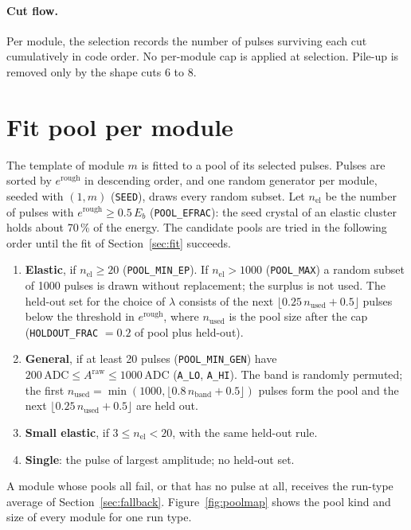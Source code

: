 \documentclass[11pt]{article}
\newcommand{\adc}{\,\mathrm{ADC}}
\newcommand{\code}[1]{\texttt{#1}}
\begin{document}
\paragraph{Cut flow.} Per module, the selection records the number of pulses surviving each cut cumulatively in code order. No per-module cap is applied at selection. Pile-up is removed only by the shape cuts 6 to 8.

\section{Fit pool per module}
\label{sec:pools}

The template of module $m$ is fitted to a pool of its selected pulses. Pulses are sorted by $e^{\mathrm{rough}}$ in descending order, and one random generator per module, seeded with $(1, m)$ (\code{SEED}), draws every random subset. Let $n_{\mathrm{el}}$ be the number of pulses with $e^{\mathrm{rough}} \ge 0.5\,E_b$ (\code{POOL\_EFRAC}): the seed crystal of an elastic cluster holds about 70\,\% of the energy. The candidate pools are tried in the following order until the fit of Section~\ref{sec:fit} succeeds.

\begin{enumerate}
\item \textbf{Elastic}, if $n_{\mathrm{el}} \ge 20$ (\code{POOL\_MIN\_EP}). If $n_{\mathrm{el}} > 1000$ (\code{POOL\_MAX}) a random subset of 1000 pulses is drawn without replacement; the surplus is not used. The held-out set for the choice of $\lambda$ consists of the next $\lfloor 0.25\, n_{\mathrm{used}} + 0.5 \rfloor$ pulses below the threshold in $e^{\mathrm{rough}}$, where $n_{\mathrm{used}}$ is the pool size after the cap (\code{HOLDOUT\_FRAC} $=0.2$ of pool plus held-out).
\item \textbf{General}, if at least 20 pulses (\code{POOL\_MIN\_GEN}) have $200\adc \le A^{\mathrm{raw}} \le 1000\adc$ (\code{A\_LO}, \code{A\_HI}). The band is randomly permuted; the first $n_{\mathrm{used}} = \min(1000, \lfloor 0.8\, n_{\mathrm{band}} + 0.5 \rfloor)$ pulses form the pool and the next $\lfloor 0.25\, n_{\mathrm{used}} + 0.5 \rfloor$ are held out.
\item \textbf{Small elastic}, if $3 \le n_{\mathrm{el}} < 20$, with the same held-out rule.
\item \textbf{Single}: the pulse of largest amplitude; no held-out set.
\end{enumerate}
A module whose pools all fail, or that has no pulse at all, receives the run-type average of Section~\ref{sec:fallback}. Figure~\ref{fig:poolmap} shows the pool kind and size of every module for one run type.
\end{document}
